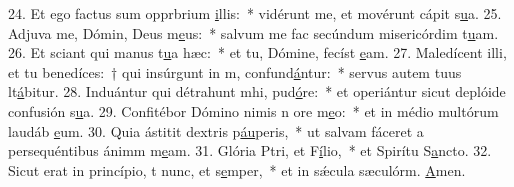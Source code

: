 24. Et ego factus sum opprbrium \uline{i}llis:~* vidérunt me, et movérunt cápit s\uline{u}a.
25. Adjuva me, Dómin, Deus m\uline{e}us:~* salvum me fac secúndum misericórdim t\uline{u}am.
26. Et sciant qui manus t\uline{u}a hæc:~* et tu, Dómine, fecíst \uline{e}am.
27. Maledícent illi, et tu benedíces:~† qui insúrgunt in m, confund\uline{á}ntur:~* servus autem tuus lt\uline{á}bitur.
28. Induántur qui détrahunt mhi, pud\uline{ó}re:~* et operiántur sicut deplóide confusión s\uline{u}a.
29. Confitébor Dómino nimis n ore m\uline{e}o:~* et in médio multórum laudáb \uline{e}um.
30. Quia ástitit  dextris p\uline{áu}peris,~* ut salvam fáceret a persequéntibus ánimm m\uline{e}am.
31. Glória Ptri, et F\uline{í}lio,~* et Spirítu S\uline{a}ncto.
32. Sicut erat in princípio, t nunc, et s\uline{e}mper,~* et in sǽcula sæculórm. \uline{A}men.
